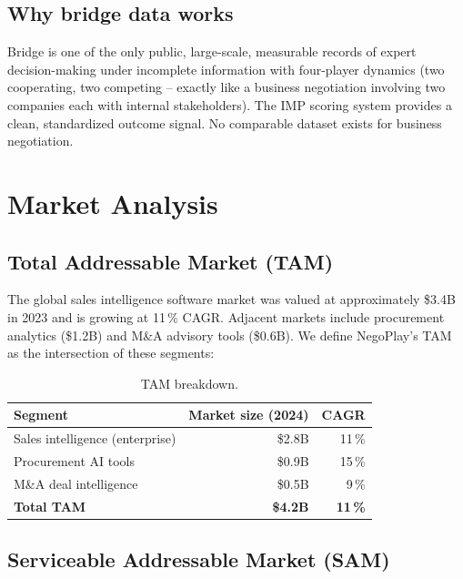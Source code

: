 \documentclass[11pt, a4paper, oneside]{report}
\begin{document}
\section{Why bridge data works}

Bridge is one of the only public, large-scale, measurable records of
expert decision-making under incomplete information with four-player
dynamics (two cooperating, two competing -- exactly like a business
negotiation involving two companies each with internal stakeholders).
The IMP scoring system provides a clean, standardized outcome signal.
No comparable dataset exists for business negotiation.

\chapter{Market Analysis}
\label{ch:market}

\section{Total Addressable Market (TAM)}

The global sales intelligence software market was valued at approximately
\$3.4B in 2023 and is growing at 11\,\% CAGR. Adjacent markets include
procurement analytics (\$1.2B) and M\&A advisory tools (\$0.6B). We
define NegoPlay's TAM as the intersection of these segments:

\begin{table}[H]
\centering\small
\caption{TAM breakdown.}
\begin{tabular}{lrr}
\toprule
\textbf{Segment} & \textbf{Market size (2024)} & \textbf{CAGR} \\
\midrule
Sales intelligence (enterprise)    & \$2.8B & 11\,\% \\
Procurement AI tools               & \$0.9B & 15\,\% \\
M\&A deal intelligence             & \$0.5B & 9\,\%  \\
\midrule
\textbf{Total TAM}                 & \textbf{\$4.2B} & \textbf{11\,\%} \\
\bottomrule
\end{tabular}
\end{table}

\section{Serviceable Addressable Market (SAM)}
\end{document}
